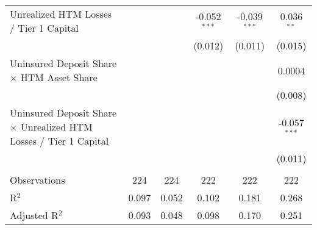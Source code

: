 \begin{table}[htbp]
\begin{adjustbox}{width = 1.2\textwidth, center}
\begin{tabular}{lccccc}
         Unrealized HTM Losses / Tier 1 Capital                                   &                &                & -0.052$^{***}$ & -0.039$^{***}$ & 0.036$^{**}$\\   
                                                                                  &                &                & (0.012)        & (0.011)        & (0.015)\\   
         Uninsured Deposit Share $\times$ HTM Asset Share                         &                &                &                &                & 0.0004\\   
                                                                                  &                &                &                &                & (0.008)\\   
         Uninsured Deposit Share $\times$ Unrealized HTM Losses / Tier 1 Capital  &                &                &                &                & -0.057$^{***}$\\   
                                                                                  &                &                &                &                & (0.011)\\   
          \\
         Observations                                                             & 224            & 224            & 222            & 222            & 222\\  
         R$^2$                                                                    & 0.097          & 0.052          & 0.102          & 0.181          & 0.268\\  
         Adjusted R$^2$                                                           & 0.093          & 0.048          & 0.098          & 0.170          & 0.251\\  
         \bottomrule
      \end{tabular}
   \end{adjustbox}
\end{table}


